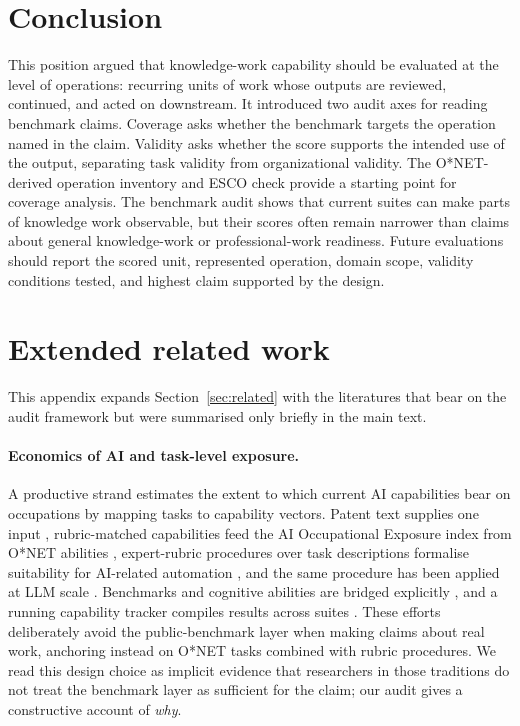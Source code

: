 \documentclass{article}
\begin{document}
\section{Conclusion}
\label{sec:conclusion}

This position argued that knowledge-work capability should be evaluated at the level of operations: recurring units of work whose outputs are reviewed, continued, and acted on downstream.
It introduced two audit axes for reading benchmark claims.
Coverage asks whether the benchmark targets the operation named in the claim.
Validity asks whether the score supports the intended use of the output, separating task validity from organizational validity. The O{*}NET-derived operation inventory and ESCO check provide a starting point for coverage analysis.
The benchmark audit shows that current suites can make parts of knowledge work observable, but their scores often remain narrower than claims about general knowledge-work or professional-work readiness.
Future evaluations should report the scored unit, represented operation, domain scope, validity conditions tested, and highest claim supported by the design.

{\small


}

\newpage
\appendix
\renewcommand{\thefigure}{\Alph{section}.\arabic{figure}}
\renewcommand{\thetable}{\Alph{section}.\arabic{table}}
\makeatletter
{}
\makeatother
\setcounter{figure}{0}
\setcounter{table}{0}

\section{Extended related work}
\label{app:related}

This appendix expands Section~\ref{sec:related} with the literatures that bear on the audit framework but were summarised only briefly in the main text.

\paragraph{Economics of AI and task-level exposure.} A productive strand estimates the extent to which current AI capabilities bear on occupations by mapping tasks to capability vectors.
Patent text supplies one input \citep{webb2020aitasks}, rubric-matched capabilities feed the AI Occupational Exposure index from O{*}NET abilities \citep{felten2021occupational}, expert-rubric procedures over task descriptions formalise suitability for AI-related automation \citep{brynjolfsson2018sml}, and the same procedure has been applied at LLM scale \citep{eloundou2023gpts}.
Benchmarks and cognitive abilities are bridged explicitly \citep{tolan2021baioe}, and a running capability tracker compiles results across suites \citep{epoch2024capability}.
These efforts deliberately avoid the public-benchmark layer when making claims about real work, anchoring instead on O{*}NET tasks combined with rubric procedures.
We read this design choice as implicit evidence that researchers in those traditions do not treat the benchmark layer as sufficient for the claim; our audit gives a constructive account of \emph{why}.
\end{document}

